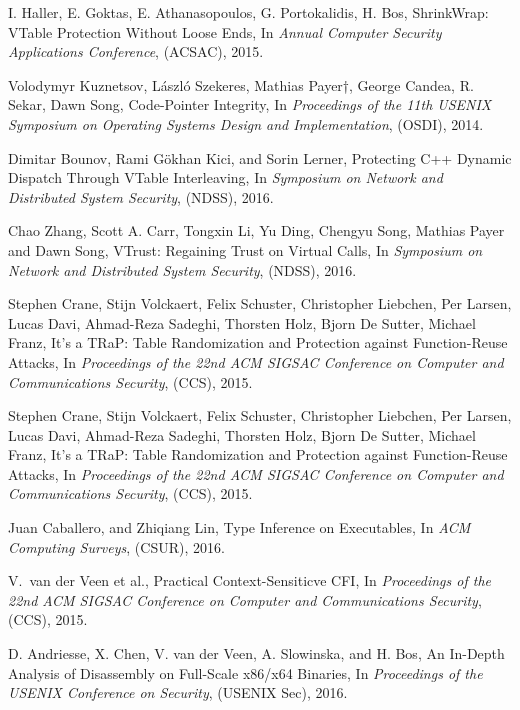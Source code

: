 \documentclass[11pt,a4paper,bibtotoc,idxtotoc,headsepline,footsepline,footexclude,BCOR12mm,DIV13]{scrbook}
\begin{document}
\begin{thebibliography}{30}
I. Haller, E. Goktas, E. Athanasopoulos, G. Portokalidis, H. Bos,
{ ShrinkWrap: VTable Protection Without Loose Ends}, In
\emph{Annual Computer Security Applications Conference}, (ACSAC), 2015.

Volodymyr Kuznetsov, László Szekeres, Mathias Payer†, George Candea, R. Sekar, Dawn Song,
{Code-Pointer Integrity}, In
\emph{Proceedings of the 11th USENIX Symposium on Operating Systems Design and Implementation}, (OSDI), 2014.

Dimitar Bounov, Rami Gökhan Kici, and Sorin Lerner,
{Protecting C++ Dynamic Dispatch Through VTable Interleaving}, In
\emph{Symposium on Network and Distributed System Security}, (NDSS), 2016.

Chao Zhang, Scott A. Carr, Tongxin Li, Yu Ding, Chengyu Song, Mathias Payer and Dawn Song,
{VTrust: Regaining Trust on Virtual Calls}, In
\emph{Symposium on Network and Distributed System Security}, (NDSS), 2016.

Stephen Crane, Stijn Volckaert, Felix Schuster, Christopher Liebchen, Per Larsen,
Lucas Davi, Ahmad-Reza Sadeghi, Thorsten Holz, Bjorn De Sutter, Michael Franz,
{It’s a TRaP: Table Randomization and Protection against Function-Reuse Attacks}, In
\emph{Proceedings of the 22nd ACM SIGSAC Conference on Computer and Communications Security}, (CCS), 2015.

Stephen Crane, Stijn Volckaert, Felix Schuster, Christopher Liebchen, Per Larsen,
Lucas Davi, Ahmad-Reza Sadeghi, Thorsten Holz, Bjorn De Sutter, Michael Franz,
{It’s a TRaP: Table Randomization and Protection against Function-Reuse Attacks}, In
\emph{Proceedings of the 22nd ACM SIGSAC Conference on Computer and Communications Security}, (CCS), 2015.

Juan Caballero, and Zhiqiang Lin,
{Type Inference on Executables}, In
\emph{ACM Computing Surveys}, (CSUR), 2016.

V.~van der Veen et al., {Practical Context-Sensiticve CFI}, In
\emph{Proceedings of the 22nd ACM SIGSAC Conference on Computer and Communications Security}, (CCS), 2015.

D. Andriesse, X. Chen, V. van der Veen, A. Slowinska, and H. Bos, 
{An In-Depth Analysis of Disassembly on Full-Scale x86/x64 Binaries}, In
\emph{Proceedings of the USENIX Conference on Security}, (USENIX Sec), 2016.


\end{thebibliography}
\end{document}
